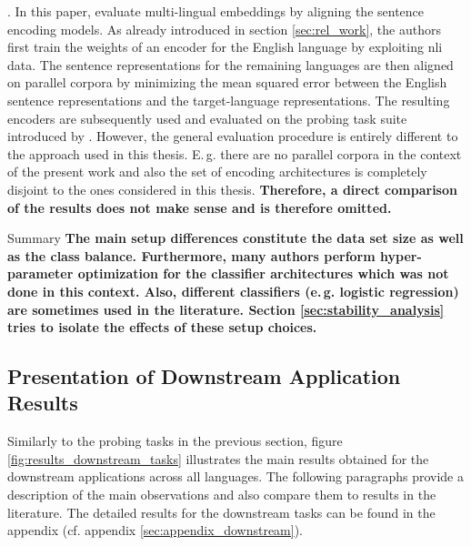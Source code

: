  . In this paper, \citep{Ravishankar.2019} evaluate multi-lingual embeddings by aligning the sentence encoding models. As already introduced in section \vref{sec:rel_work}, the authors first train the weights of an encoder for the English language by exploiting \gls{nli} data. The sentence representations for the remaining languages are then aligned on parallel corpora by minimizing the mean squared error between the English sentence representations and the target-language representations. The resulting encoders are subsequently used and evaluated on the probing task suite introduced by \citep{Conneau.2018a}. However, the general evaluation procedure is entirely different to the approach used in this thesis. E.\,g. there are no parallel corpora in the context of the present work and also the set of encoding architectures is completely disjoint to the ones considered in this thesis. \textbf{Therefore, a direct comparison of the results does not make sense and is therefore omitted.}

\begin{tudbox}{Summary}
\textbf{The main setup differences constitute the data set size as well as the class balance. Furthermore, many authors perform hyper-parameter optimization for the classifier architectures which was not done in this context. Also, different classifiers (e.\,g. logistic regression) are sometimes used in the literature. Section \vref{sec:stability_analysis} tries to isolate the effects of these setup choices.}
\end{tudbox}

\newpage
\subsection{Presentation of Downstream Application Results}
\label{sec:results_downstream_tasks}

Similarly to the probing tasks in the previous section, figure \vref{fig:results_downstream_tasks} illustrates the main results obtained for the downstream applications across all languages. The following paragraphs provide a description of the main observations and also compare them to results in the literature. The detailed results for the downstream tasks can be found in the appendix (cf. appendix \vref{sec:appendix_downstream}).

